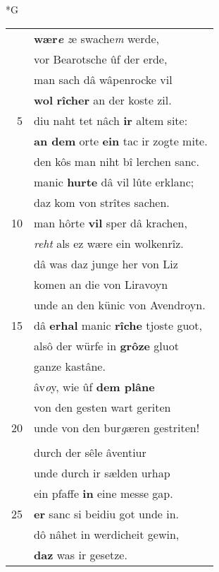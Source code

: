 \documentclass[8pt,a4paper,notitlepage]{article}
\begin{document}
\begin{table}[ht]
\begin{minipage}[t]{0.5\linewidth}
\small
\begin{center}*G
\end{center}
\begin{tabular}{rl}
 & \textbf{wær\textit{e}} \textit{z}e swache\textit{m} werde,\\ 
 & vor Bearotsche ûf der erde,\\ 
 & man sach dâ wâpenrocke vil\\ 
 & \textbf{wol} \textbf{rîcher} an der koste zil.\\ 
5 & diu naht tet nâch \textbf{ir} altem site:\\ 
 & \textbf{an dem} orte \textbf{ein} tac ir zogte mite.\\ 
 & den kôs man niht bî lerchen sanc.\\ 
 & manic \textbf{hurte} dâ vil lûte erklanc;\\ 
 & daz kom von strîtes sachen.\\ 
10 & man hôrte \textbf{vil} sper dâ krachen,\\ 
 & \textit{reht} als ez wære ein wolkenrîz.\\ 
 & dâ was daz junge her von Liz\\ 
 & komen an die von Liravoyn\\ 
 & unde an den künic von Avendroyn.\\ 
15 & dâ \textbf{erhal} manic \textbf{rîche} tjoste guot,\\ 
 & alsô der würfe in \textbf{grôze} gluot\\ 
 & ganze kastâne.\\ 
 & âv\textit{o}y, wie ûf \textbf{dem plâne}\\ 
 & von den gesten wart geriten\\ 
20 & unde von den bur\textit{g}æren gestriten!\\ 
 & \textbf{\begin{large}G\end{large}awan} unde \textbf{der schahteliur},\\ 
 & durch der sêle âventiur\\ 
 & unde durch ir sælden urhap\\ 
 & ein pfaffe \textbf{in} eine messe gap.\\ 
25 & \textbf{er} sanc si beidiu got unde in.\\ 
 & dô nâhet in werdicheit gewin,\\ 
 & \textbf{daz} was ir gesetze.\\ 

\end{tabular}
\end{minipage}
\end{table}
\end{document}
